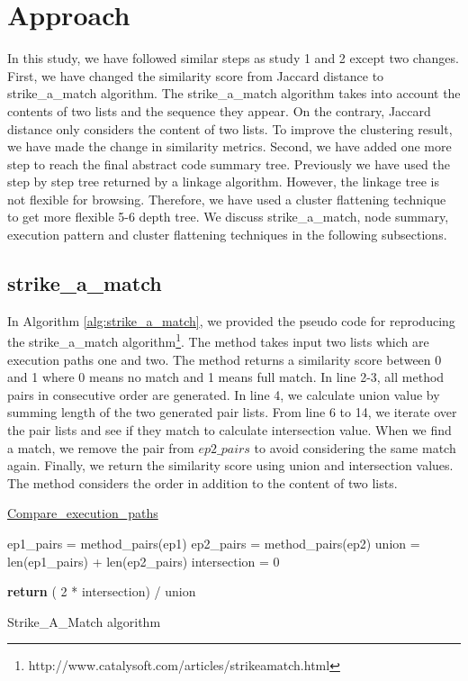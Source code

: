 \section{Approach}
\label{hla3:approach}
In this study, we have followed similar steps as study 1 and 2 except two changes. First, we have changed the similarity score from Jaccard distance to strike\_a\_match algorithm. The strike\_a\_match algorithm takes into account the contents of two lists and the sequence they appear. On the contrary, Jaccard distance only considers the content of two lists. To improve the clustering result, we have made the change in similarity metrics. Second, we have added one more step to reach the final abstract code summary tree. Previously we have used the step by step tree returned by a linkage algorithm. However, the linkage tree is not flexible for browsing. Therefore, we have used a cluster flattening technique to get more flexible 5-6 depth tree. We discuss strike\_a\_match, node summary, execution pattern and cluster flattening techniques in the following subsections. 

\subsection{strike\_a\_match}
In Algorithm \ref{alg:strike_a_match}, we provided the pseudo code for reproducing the strike\_a\_match algorithm\footnote{http://www.catalysoft.com/articles/strikeamatch.html}. The method takes input two lists which are execution paths one and two. The method returns a similarity score between 0 and 1 where 0 means no match and 1 means full match. In line 2-3, all method pairs in consecutive order are generated. In line 4, we calculate union value by summing length of the two generated pair lists. From line 6 to 14, we iterate over the pair lists and see if they match to calculate intersection value. When we find a match, we remove the pair from $ep2\_pairs$ to avoid considering the same match again. Finally, we return the similarity score using union and intersection values. The method considers the order in addition to the content of two lists. 


\begin{algorithm}
    
    \underline{Compare\_execution\_paths} 
    
    ep1\_pairs = method\_pairs(ep1)\; 
    ep2\_pairs = method\_pairs(ep2)\;
    union = len(ep1\_pairs) + len(ep2\_pairs)\;
    intersection = 0\;
    
    \textbf{return} ( 2 * intersection) / union
    
    \caption{Strike\_A\_Match algorithm}
    \label{alg:strike_a_match}
\end{algorithm}

